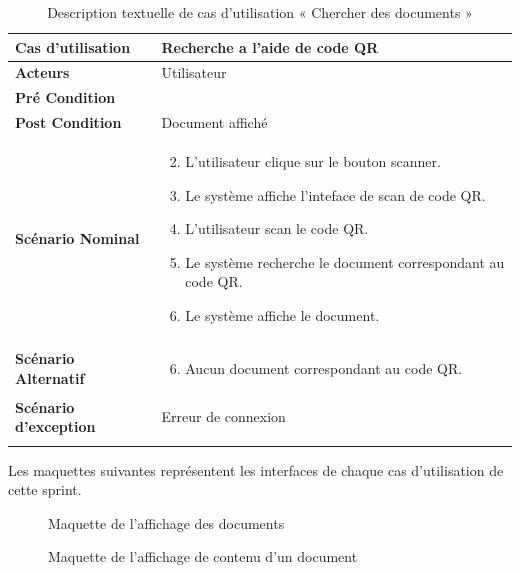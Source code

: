 \begin{longtable}{|p{5cm}|p{10cm}|}
\hline
\textbf{Cas d'utilisation}&Recherche a l'aide de code QR\\
\hline
\textbf{Acteurs}&Utilisateur\\
\hline
\textbf{Pré Condition}&\\
\hline
\textbf{Post Condition}&Document affiché\\
\hline
\textbf{Scénario Nominal}&
\vspace{-\baselineskip}
\begin{enumerate}
    \setcounter{enumi}{1}
    \item L'utilisateur clique sur le bouton scanner.
    \item Le système affiche l'inteface de scan de code QR.
    \item L'utilisateur scan le code QR.
    \item Le système recherche le document correspondant au code QR.
    \item Le système affiche le document.
\end{enumerate}\\
\hline
\textbf{Scénario Alternatif}&
\vspace{-\baselineskip}
\begin{enumerate}
    \setcounter{enumi}{5}
    \item Aucun document correspondant au code QR.
\end{enumerate}\\
\hline
\textbf{Scénario d'exception}&Erreur de connexion\\
\hline
\caption{Description textuelle de cas d'utilisation « Chercher des documents »}
\label{tab:DescriptionTextuelleDeCasDUtilisationChercherDesDocumentsQR}
\end{longtable}


Les maquettes suivantes représentent les interfaces de chaque cas d'utilisation de cette sprint. \\

\begin{figure}[H]
  \centering
  \caption{Maquette de l'affichage des documents}
  \label{fig:design_show_documents}
\end{figure}

\begin{figure}[H]
  \centering
  \caption{Maquette de l'affichage de contenu d'un document}
  \label{fig:design_show_document}
\end{figure}

